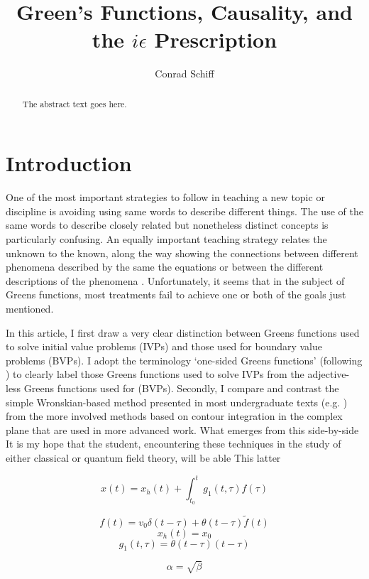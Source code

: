 \documentclass{article}
\begin{document}
\title{Green's Functions, Causality, and the $i \epsilon$ Prescription}
\author{Conrad Schiff}

\maketitle

\begin{abstract}
The abstract text goes here.
\end{abstract}

\section{Introduction}
One of the most important strategies to follow in teaching a new topic or discipline
is avoiding using same words to describe different things. The use of the same 
words to describe closely related but nonetheless distinct concepts is particularly
confusing. An equally important teaching strategy relates the unknown to the known, 
along the way showing the connections between different phenomena described by the 
same the equations or between the different descriptions of the phenomena . 
Unfortunately, it seems that in the subject of Greens functions, 
most treatments fail to achieve one or both of the goals just mentioned.  

In this article, I first draw a very clear distinction between Greens functions 
used to solve initial value problems (IVPs) and those used for boundary value problems (BVPs). 
I adopt the terminology `one-sided Greens functions' (following \cite{}) to clearly label 
those Greens functions used to solve IVPs from the adjective-less Greens functions used for (BVPs).  
Secondly, I compare and contrast the simple Wronskian-based method presented in most
undergraduate texts (e.g. \cite{}) from the more involved methods based on contour integration
in the complex plane that are used in more advanced work. What emerges from this side-by-side
 It is my hope that the student,
encountering these techniques in the study of either classical or quantum field theory, will
be able This latter  

\[
  x(t) = x_h(t) + \int_{t_0}^{t} g_1(t,\tau) f(\tau)
\]

\[
  f(t) = v_0 \delta(t-\tau) + \theta(t-\tau) {\tilde f}(t)
\]
\[
  x_h(t) = x_0
\]
\[
  g_1(t,\tau) = \theta(t-\tau) (t-\tau)
\]

\begin{equation}
    \label{simple_equation}
    \alpha = \sqrt{ \beta }
\end{equation}
\end{document}
